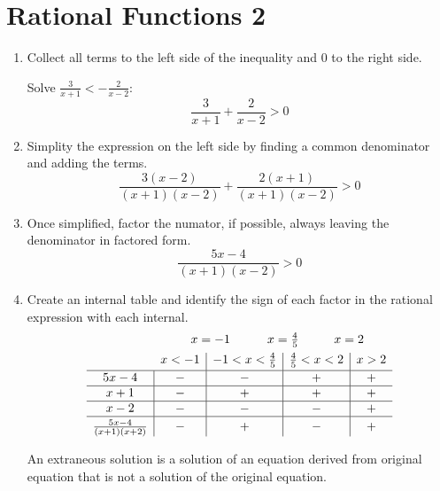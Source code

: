 \section{Rational Functions 2}
\begin{enumerate}
    \item Collect all terms to the left side of the inequality and $0$ to the right side.
        \begin{eg}
            Solve $\frac{3}{x+1}<-\frac{2}{x-2}$:
            \[
                \frac{3}{x+1}+\frac{2}{x-2}>0
            \]
        \end{eg}
    \item Simplity the expression on the left side by finding a common denominator and adding the terms.
        \[
            \frac{3(x-2)}{(x+1)(x-2)}+\frac{2(x+1)}{(x+1)(x-2)}>0
        \]
    \item Once simplified, factor the numator, if possible, always leaving the denominator in factored form.
        \[
            \frac{5x-4}{(x+1)(x-2)}>0
        \]
    \item Create an internal table and identify the sign of each factor in the rational expression with each internal.
        \[
            \begin{array}{c|c|c|c|c}
                \multicolumn{1}{c}{} & \multicolumn{4}{l}{\hspace{2.45em} x=-1 \hspace{3em} x=\frac{4}{5} \hspace{2.85em} x=2} \\[1ex]
                \multicolumn{1}{c}{} & x<-1 & -1<x<\frac{4}{5} & \frac{4}{5}<x<2 & x>2 \\[0.5ex] \hline
                5x-4 & - & - & + & + \\ \hline
                x+1  & - & + & + & + \\ \hline
                x-2  & - & - & - & + \\ \hline
                \rule{0pt}{2.5ex}
                \frac{5x-4}{(x+1)(x+2)} & - & + & - & +
            \end{array}
        \]
        \begin{note}
            An extraneous solution is a solution of an equation derived from original equation that is not a solution of the original equation.
        \end{note}
\end{enumerate}